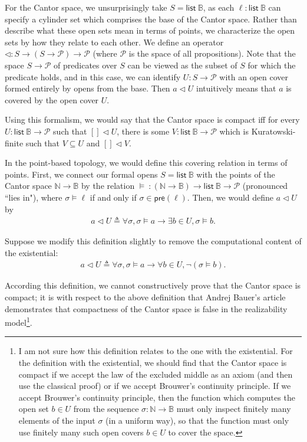 \documentclass{article}           %
\newcommand{\Prop}{\mathcal{P}}
\newcommand{\nat}{\mathbb{N}}
\newcommand{\bool}{\mathbb{B}}
\newcommand{\List}[1]{\mathsf{list}\ {#1}}
\newcommand{\cov}{\triangleleft}
\begin{document}
For the Cantor space, we unsurprisingly take $S = \List{\bool}$, as each $\ell : \List{\bool}$ can specify a cylinder set which comprises the base of the Cantor space. Rather than describe what these open sets mean in terms of points, we characterize the open sets by how they relate to each other. We define an operator $\cov : S \to (S \to \Prop) \to \Prop$ (where $\Prop$ is the space of all propositions). Note that the space $S \to \Prop$ of predicates over $S$ can be viewed as the subset of $S$ for which the predicate holds, and in this case, we can identify $U : S \to \Prop$ with an open cover formed entirely by opens from the base. Then $a \cov U$ intuitively means that $a$ is covered by the open cover $U$.

Using this formalism, we would say that the Cantor space is compact iff for every $U : \List{\bool} \to \Prop$ such that $[] \cov U$, there is some $V : \List{\bool} \to \Prop$ which is Kuratowski-finite such that $V \subseteq U$ and $[] \cov V$.

In the point-based topology, we would define this covering relation in terms of points. First, we connect our formal opens $S = \List{\bool}$ with the points of the Cantor space $\nat \to \bool$ by the relation $\models\  : (\nat \to \bool) \to \List{\bool} \to \Prop$ (pronounced ``lies in"), where $\sigma \models \ell$ if and only if $\sigma \in \mathsf{pre}(\ell)$. Then, we would define $a \cov U$ by
\begin{align}
\label{ptcov1}
a \cov U \triangleq \forall \sigma, \sigma \models a \to \exists b \in U, \sigma \models b.
\end{align}

Suppose we modify this definition slightly to remove the computational content of the existential:
\begin{align}
\label{ptcov2}
a \cov U \triangleq \forall \sigma, \sigma \models a \to \forall b \in U, \neg \left( \sigma \models b \right).
\end{align}

According this definition, we cannot constructively prove that the Cantor space is compact; it is with respect to the above definition that Andrej Bauer's article demonstrates that compactness of the Cantor space is false in the realizability model\footnote{I am not sure how this definition relates to the one with the existential. For the definition with the existential, we should find that the Cantor space is compact if we accept the law of the excluded middle as an axiom (and then use the classical proof) or if we accept Brouwer's continuity principle. If we accept Brouwer's continuity principle, then the function which computes the open set $b \in U$ from the sequence $\sigma : \nat \to \bool$ must only inspect finitely many elements of the input $\sigma$ (in a uniform way), so that the function must only use finitely many such open covers $b \in U$ to cover the space.}.
\end{document}
